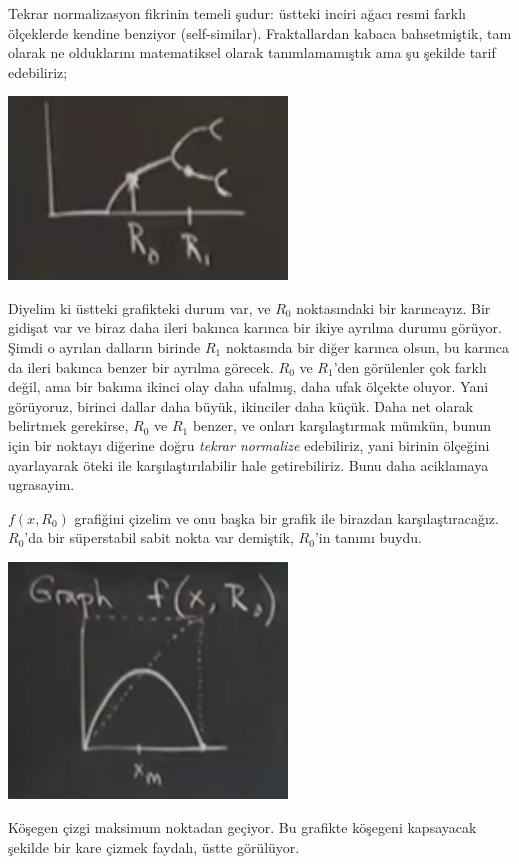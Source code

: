 \documentclass[12pt,fleqn]{article}\usepackage{../../common}
\begin{document}
Tekrar normalizasyon fikrinin temeli şudur: üstteki inciri ağacı resmi farklı
ölçeklerde kendine benziyor (self-similar). Fraktallardan kabaca bahsetmiştik,
tam olarak ne olduklarını matematiksel olarak tanımlamamıştık ama şu şekilde
tarif edebiliriz;

\includegraphics[width=20em]{21_03.png}

Diyelim ki üstteki grafikteki durum var, ve $R_0$ noktasındaki bir
karıncayız. Bir gidişat var ve biraz daha ileri bakınca karınca bir ikiye
ayrılma durumu görüyor. Şimdi o ayrılan dalların birinde $R_1$ noktasında bir
diğer karınca olsun, bu karınca da ileri bakınca benzer bir ayrılma
görecek. $R_0$ ve $R_1$'den görülenler çok farklı değil, ama bir bakıma ikinci
olay daha ufalmış, daha ufak ölçekte oluyor. Yani görüyoruz, birinci dallar daha
büyük, ikinciler daha küçük. Daha net olarak belirtmek gerekirse, $R_0$ ve $R_1$
benzer, ve onları karşılaştırmak mümkün, bunun için bir noktayı diğerine doğru
{\em tekrar normalize} edebiliriz, yani birinin ölçeğini ayarlayarak öteki ile
karşılaştırılabilir hale getirebiliriz. Bunu daha aciklamaya ugrasayim. 

$f(x,R_0)$ grafiğini çizelim ve onu başka bir grafik ile birazdan
karşılaştıracağız.  $R_0$'da bir süperstabil sabit nokta var demiştik, $R_0$'in
tanımı buydu.

\includegraphics[width=20em]{21_04.png}

Köşegen çizgi maksimum noktadan geçiyor. Bu grafikte köşegeni kapsayacak şekilde
bir kare çizmek faydalı, üstte görülüyor.
\end{document}
